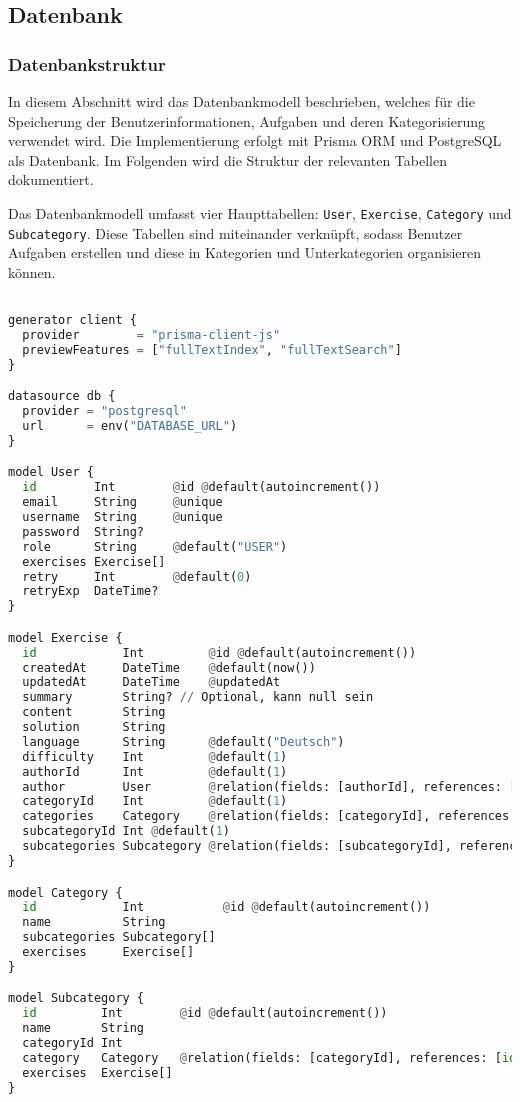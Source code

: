 \subsection{Datenbank}

\subsubsection{Datenbankstruktur}

In diesem Abschnitt wird das Datenbankmodell beschrieben, welches für die Speicherung der Benutzerinformationen, Aufgaben und deren Kategorisierung verwendet wird. Die Implementierung erfolgt mit Prisma ORM und PostgreSQL als Datenbank. Im Folgenden wird die Struktur der relevanten Tabellen dokumentiert.

Das Datenbankmodell umfasst vier Haupttabellen: \texttt{User}, \texttt{Exercise}, \texttt{Category} und \texttt{Subcategory}. Diese Tabellen sind miteinander verknüpft, sodass Benutzer Aufgaben erstellen und diese in Kategorien und Unterkategorien organisieren können.

\begin{lstlisting}[language=Python]

generator client {
  provider        = "prisma-client-js"
  previewFeatures = ["fullTextIndex", "fullTextSearch"]
}

datasource db {
  provider = "postgresql"
  url      = env("DATABASE_URL")
}

model User {
  id        Int        @id @default(autoincrement())
  email     String     @unique
  username  String     @unique 
  password  String?
  role      String     @default("USER")
  exercises Exercise[]
  retry     Int        @default(0)
  retryExp  DateTime?  
}

model Exercise {
  id            Int         @id @default(autoincrement())
  createdAt     DateTime    @default(now())
  updatedAt     DateTime    @updatedAt
  summary       String? // Optional, kann null sein
  content       String
  solution      String
  language      String      @default("Deutsch")
  difficulty    Int         @default(1)
  authorId      Int         @default(1)
  author        User        @relation(fields: [authorId], references: [id])
  categoryId    Int         @default(1)
  categories    Category    @relation(fields: [categoryId], references: [id])
  subcategoryId Int @default(1)
  subcategories Subcategory @relation(fields: [subcategoryId], references: [id])
}

model Category {
  id            Int           @id @default(autoincrement())
  name          String
  subcategories Subcategory[]
  exercises     Exercise[]
}

model Subcategory {
  id         Int        @id @default(autoincrement())
  name       String
  categoryId Int
  category   Category   @relation(fields: [categoryId], references: [id], onDelete: Cascade)
  exercises  Exercise[]
}

\end{lstlisting}




